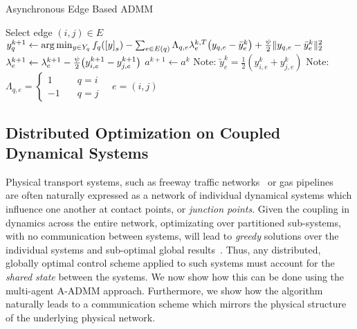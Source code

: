 \begin{algorithm}[t]  %
\caption{Asynchronous Edge Based ADMM} %
\label{alg:a-admm}       %
\begin{algorithmic}[1]%
    \STATE Select edge $\left(i,j\right) \in E$
        \STATE $ y^{k+1}_q \gets \arg \min_{y \in Y_q} f_q\left(\left[y\right]_{s}\right) - \sum_{e \in E\left(q\right)}
        \Lambda_{q,e} \lambda^{k,T}_{e} \left(y_{q,e} - \bar{y}^{k}_{e} \right) +
        \frac{\augterm}{2} \|y_{q,e} - \bar{y}^{k}_{e}\|_2^2 $ \label{lst:local-state-update}
        \ENDFOR
        \STATE $\lambda^{k+1}_{e} \gets \lambda^{k+1}_{e} - \frac{\augterm}{2} \left(y^{k+1}_{i,e} - y^{k+1}_{j,e}\right)$
        \STATE $a^{k+1} \gets a^{k}$
        \ENDFOR
    \ENDWHILE
    \STATE Note: $\tilde{y}^{k}_{e} = \frac{1}{2} \left(y^k_{i,e} + y^k_{j,e}\right)$
    \STATE Note: $\Lambda_{q,e} = \begin{cases} 1 & \quad q = i \\ -1 & \quad q = j \end{cases} \quad e = (i,j)$
\end{algorithmic}
\end{algorithm}


\subsection{Distributed Optimization on Coupled Dynamical Systems} %
\label{sec:distributed_optimization_of_coupled_dynamical_systems}

Physical transport systems, such as freeway traffic networks~\cite{Reilly2013AdjointBased,daganzo1995cell} or gas pipelines~\cite{Gugat2011Gas} are often naturally expressed as a network of individual dynamical systems which influence one another at contact points, or \emph{junction points}. Given the coupling in dynamics across the entire network, optimizating over partitioned sub-systems, with no communication between systems, will lead to \emph{greedy} solutions over the individual systems and sub-optimal global results~\cite{Ramon2013}. Thus, any distributed, globally optimal control scheme applied to such systems must account for the \emph{shared state} between the systems. We now show how this can be done using the multi-agent A-ADMM approach. Furthermore, we show how the algorithm naturally leads to a communication scheme which mirrors the physical structure of the underlying physical network.

